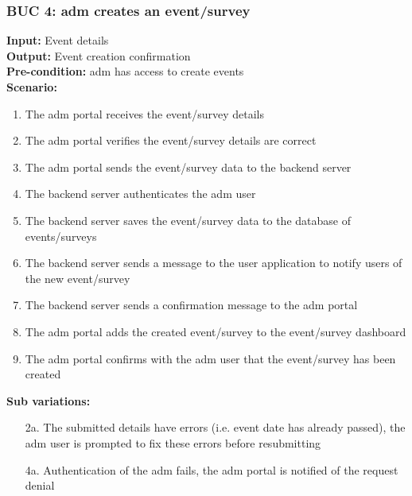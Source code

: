 \documentclass[12pt]{article}
\begin{document}
\subsubsection*{BUC 4: \Gls{adm} creates an event/survey}
\textbf{Input:} Event details \\
\textbf{Output:} Event creation confirmation \\
\textbf{Pre-condition:} \Gls{adm} has access to create events \\
\textbf{Scenario:}
\begin{enumerate}
  \item The \gls{adm} portal receives the event/survey details
  \item The \gls{adm} portal verifies the event/survey details are correct
  \item The \gls{adm} portal sends the event/survey data to the backend server
  \item The backend server authenticates the \gls{adm} user
  \item The backend server saves the event/survey data to the database of events/surveys
  \item The backend server sends a message to the user application to notify users of the new event/survey
  \item The backend server sends a confirmation message to the \gls{adm} portal
  \item The \gls{adm} portal adds the created event/survey to the event/survey dashboard
  \item The \gls{adm} portal confirms with the \gls{adm} user that the event/survey has been created
\end{enumerate}
\textbf{Sub variations:}
\begin{itemize}
  \item [2a.] The submitted details have errors (i.e. event date has already passed), the \gls{adm} user is prompted to fix these errors before resubmitting
  \item [4a.] Authentication of the \gls{adm} fails, the \gls{adm} portal is notified of the request denial
\end{itemize}
\end{document}
